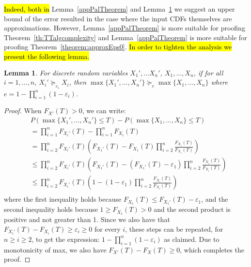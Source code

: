 \documentclass[review]{elsarticle}
\newtheorem{lemma}{Lemma}
\begin{document}
\hl{Indeed, both in} Lemma~\ref{appPalTheorem} and  Lemma~\ref{tightPalTheorem} we suggest an upper bound of the error resulted in the case where the input CDFs themselves are approximations. However, Lemma~\ref{appPalTheorem} is more suitable for proofing Theorem~\ref{th:TTalgcomplexity} and Lemma~\ref{appPalTheorem} is more suitable for proofing Theorem~\ref{theorem:approxEps0}. \hl{In order to tighten the analysis we present the following lemma.}
\begin{lemma} \label{tightPalTheorem}
For discrete random variables $X_1', \dots X_n'$, $X_1, \dots,X_n$, if for all $i=1,\dots,n$,  $X_i' \succeq_{\varepsilon_i} X_i$,
then $\max\{X_1',\dots, X_n'\} \succeq_{e} \max\{X_1,\dots,X_n\}$ where $e=1-\prod_{i=1}^n (1-\varepsilon_i)$.
\end{lemma}
\begin{proof}
When $F_{X'}(T) >0$, we can write:
{
\begin{align*} 
&P(\max\{X_1',\dots, X_n'\} {\leq} T) - P(\max\{X_1,\dots, X_n\} {\leq} T)\\
&=\prod_{i=1}^n F_{X_i'}(T)-\prod_{i=1}^n F_{X_i}(T)\\
&= \prod_{i=2}^n F_{X_i'}(T)(F_{X_1'}(T) - 
F_{X_1}(T) \prod_{i=2}^n \frac{F_{X_i}(T)}{F_{X_i}(T)}) \\
&\leq \prod_{i=2}^n F_{X_i'}(T)(F_{X_1'}(T) - 
   (F_{X_1'}(T) - \varepsilon_1)
   \prod_{i=2}^n \frac{F_{X_i}(T)}{F_{X_i}(T)}) \\
&\leq \prod_{i=2}^n F_{X_i'}(T)(1 -  (1 - \varepsilon_1)
   \prod_{i=2}^n \frac{F_{X_i}(T)}{F_{X_i}(T)}) \\
\end{align*}}%
where the first inequality holds because 
$F_{X_1}(T) \leq F_{X_1'}(T) - \varepsilon_1$, and
the second inequality holds because 
$1 \geq F_{X_1}(T) > 0$ and the second product is positive
and not greater than 1. Since we also have 
that $F_{X_i'}(T) - F_{X_i}(T) \geq 
\varepsilon_i \geq 0$ for every $i$, these steps can be repeated, for $n\geq i \geq 2$, to get the expression: 
$1-\prod_{i=1}^n  (1-\varepsilon_i)$ as claimed. 
Due to monotonicity of max,
we also have $F_{X'}(T) - F_{X}(T) \geq 0$, which
completes the proof.
\end{proof}
\end{document}
